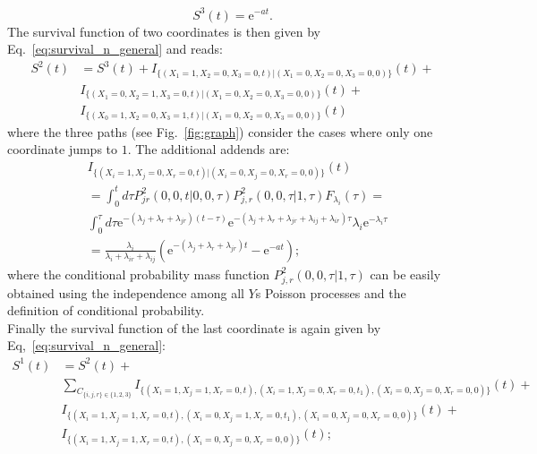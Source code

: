 \documentclass[a4paper,11pt]{amsart}
\theoremstyle{remark}
\newcommand{\ee}[1]{\mathrm{e}^{#1}}
\begin{document}
\begin{equation}
  \label{eq:S3_tri}
  S^3(t)=\ee{-at}.
\end{equation}
The  survival function of two coordinates is then given by Eq.~\eqref{eq:survival_n_general} and reads:
\begin{equation}
  \label{eq:S2_tri}
  \begin{aligned}
    S^2(t)&=S^3(t)+I_{\{(X_1=1,X_2=0,X_3=0,t)|(X_1=0,X_2=0,X_3=0,0)\}}(t)+\\
          &I_{\{(X_1=0,X_2=1,X_3=0,t)|(X_1=0,X_2=0,X_3=0,0)\}}(t)+\\
          &I_{\{(X_0=1,X_2=0,X_3=1,t)|(X_1=0,X_2=0,X_3=0,0)\}}(t)
  \end{aligned}
\end{equation}
where the three paths (see Fig.~\ref{fig:graph}) consider the cases where only one coordinate jumps to $1$. The additional addends are:
\begin{equation}
  \label{eq:G_1_1}
  \begin{aligned}
    &I_{\{(X_i=1,X_j=0,X_r=0,t)|(X_i=0,X_j=0,X_r=0,0)\}}(t)\\
    &=\int_0^t d\tau P^2_{jr}(0,0,t|0,0,\tau)P^2_{j,r}(0,0,\tau|1,\tau)F_{\lambda_i}(\tau)=\\
    &\int_0^\tau d\tau \ee{-(\lambda_j+\lambda_r+\lambda_{jr})(t-\tau)}\ee{-(\lambda_j+\lambda_r+\lambda_{jr}+\lambda_{ij}+\lambda_{ir})\tau}\lambda_i\ee{-\lambda_i \tau}\\
    &=\frac{\lambda_i}{\lambda_i+\lambda_{ir}+\lambda_{ij}}\left(\ee{-(\lambda_j+\lambda_r+\lambda_{jr})t}-\ee{-at}\right);
  \end{aligned}
\end{equation}
where the conditional probability mass function $P^2_{j,r}(0,0,\tau|1,\tau)$ can be easily obtained using the independence among all $Y$s Poisson processes and the definition of conditional probability.\\
Finally the survival function of the last coordinate is again given by Eq,~\eqref{eq:survival_n_general}:
\begin{equation}
  \label{eq:S3_tri}
  \begin{aligned}
    S^1(t)&=S^2(t)+\\
          &\sum_{C_{\{i,j,r\}\in\{1,2,3\}}} I_{\{(X_i=1,X_j=1,X_r=0,t),(X_i=1,X_j=0,X_r=0,t_1),(X_i=0,X_j=0,X_r=0,0)\}}(t)+ \\
          &I_{\{(X_i=1,X_j=1,X_r=0,t),(X_i=0,X_j=1,X_r=0,t_1),(X_i=0,X_j=0,X_r=0,0)\}}(t)+\\
    &I_{\{(X_i=1,X_j=1,X_r=0,t),(X_i=0,X_j=0,X_r=0,0)\}}(t);
  \end{aligned}
\end{equation}
\end{document}
